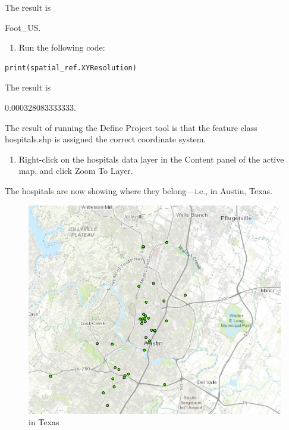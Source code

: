 \documentclass[]{article}
\providecommand{\tightlist}{%
  \setlength{\itemsep}{0pt}\setlength{\parskip}{0pt}}
\begin{document}
The result is

Foot\_US.

\begin{enumerate}
\def\labelenumi{\arabic{enumi}.}
\setcounter{enumi}{9}
\tightlist
\item
  Run the following code:
\end{enumerate}

\begin{verbatim}
print(spatial_ref.XYResolution)
\end{verbatim}

The result is

0.000328083333333.

The result of running the Define Project tool is that the feature class
hospitals.shp is assigned the correct coordinate system.

\begin{enumerate}
\def\labelenumi{\arabic{enumi}.}
\setcounter{enumi}{10}
\tightlist
\item
  Right-click on the hospitals data layer in the Content panel of the
  active map, and click Zoom To Layer.
\end{enumerate}

The hospitals are now showing where they belong---i.e., in Austin,
Texas.

\begin{figure}
\centering
\includegraphics{./labs/images/lab02_intexas.png}
\caption{in Texas}
\end{figure}
\end{document}
